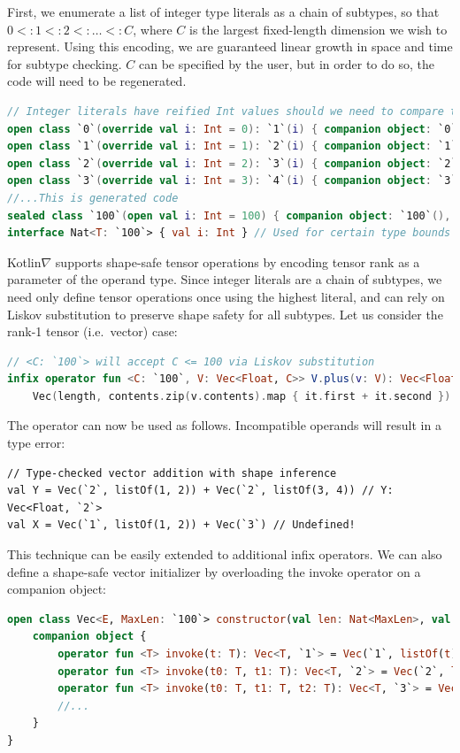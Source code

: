 \documentclass[12pt,initial,twoside,maitrise]{dms}
\numberwithin{equation}{section}
\numberwithin{table}{chapter}
\numberwithin{figure}{chapter}
\begin{document}
First, we enumerate a list of integer type literals as a chain of subtypes, so that $0 <: 1 <: 2 <: \dots <: C$, where $C$ is the largest fixed-length dimension we wish to represent. Using this encoding, we are guaranteed linear growth in space and time for subtype checking. $C$ can be specified by the user, but in order to do so, the code will need to be regenerated.
%
\begin{lstlisting}[caption={Shape safe tensor addition for rank-1 tensors, $\forall L\leq2.$}, language=Kotlin]
// Integer literals have reified Int values should we need to compare them at runtime
open class `0`(override val i: Int = 0): `1`(i) { companion object: `0`(), Nat<`0`> }
open class `1`(override val i: Int = 1): `2`(i) { companion object: `1`(), Nat<`1`> }
open class `2`(override val i: Int = 2): `3`(i) { companion object: `2`(), Nat<`2`> }
open class `3`(override val i: Int = 3): `4`(i) { companion object: `3`(), Nat<`3`> }
//...This is generated code
sealed class `100`(open val i: Int = 100) { companion object: `100`(), Nat<`100`> }
interface Nat<T: `100`> { val i: Int } // Used for certain type bounds
\end{lstlisting}
%
Kotlin$\nabla$ supports shape-safe tensor operations by encoding tensor rank as a parameter of the operand type. Since integer literals are a chain of subtypes, we need only define tensor operations once using the highest literal, and can rely on Liskov substitution to preserve shape safety for all subtypes. Let us consider the rank-1 tensor (i.e.\ vector) case:
%
\begin{lstlisting}[language=Kotlin]
// <C: `100`> will accept C <= 100 via Liskov substitution
infix operator fun <C: `100`, V: Vec<Float, C>> V.plus(v: V): Vec<Float, C> =
    Vec(length, contents.zip(v.contents).map { it.first + it.second })
\end{lstlisting}
%
The operator can now be used as follows. Incompatible operands will result in a type error:
%
\begin{lstlisting}
// Type-checked vector addition with shape inference
val Y = Vec(`2`, listOf(1, 2)) + Vec(`2`, listOf(3, 4)) // Y: Vec<Float, `2`>
val X = Vec(`1`, listOf(1, 2)) + Vec(`3`) // Undefined!
\end{lstlisting}
%
This technique can be easily extended to additional infix operators. We can also define a shape-safe vector initializer by overloading the invoke operator on a companion object:
%
\begin{lstlisting}[language=Kotlin]
open class Vec<E, MaxLen: `100`> constructor(val len: Nat<MaxLen>, val contents: List<E>) {
    companion object {
        operator fun <T> invoke(t: T): Vec<T, `1`> = Vec(`1`, listOf(t))
        operator fun <T> invoke(t0: T, t1: T): Vec<T, `2`> = Vec(`2`, listOf(t0, t1))
        operator fun <T> invoke(t0: T, t1: T, t2: T): Vec<T, `3`> = Vec(`3`, listOf(t0, t1, t2))
        //...
    }
}
\end{lstlisting}
\end{document}
